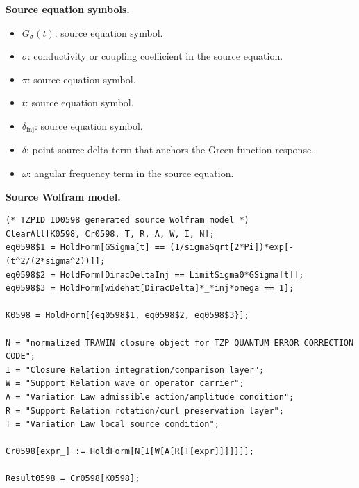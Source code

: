\begin{minipage}[t]{0.49\linewidth}
\begingroup
\small
\raggedright
\textbf{Source equation symbols.}\par
\begin{itemize}[leftmargin=1.35em,itemsep=1pt,topsep=1pt,parsep=0pt]
    \item $G_{\sigma}(t)$: source equation symbol.
    \item $\sigma$: conductivity or coupling coefficient in the source equation.
    \item $\pi$: source equation symbol.
    \item $t$: source equation symbol.
    \item $\delta_{\mathrm{inj}}$: source equation symbol.
    \item $\delta$: point-source delta term that anchors the Green-function response.
    \item $\omega$: angular frequency term in the source equation.
\end{itemize}
\endgroup
\end{minipage}\hfill
\begin{minipage}[t]{0.47\linewidth}
\begingroup
\scriptsize
\raggedright
\textbf{Source Wolfram model.}\par
\begin{Verbatim}[fontsize=\tiny,breaklines=true,breakanywhere=true]
(* TZPID ID0598 generated source Wolfram model *)
ClearAll[K0598, Cr0598, T, R, A, W, I, N];
eq0598$1 = HoldForm[GSigma[t] == (1/sigmaSqrt[2*Pi])*exp[-(t^2/(2*sigma^2))]];
eq0598$2 = HoldForm[DiracDeltaInj == LimitSigma0*GSigma[t]];
eq0598$3 = HoldForm[widehat[DiracDelta]*_*inj*omega == 1];

K0598 = HoldForm[{eq0598$1, eq0598$2, eq0598$3}];

N = "normalized TRAWIN closure object for TZP QUANTUM ERROR CORRECTION CODE";
I = "Closure Relation integration/comparison layer";
W = "Support Relation wave or operator carrier";
A = "Variation Law admissible action/amplitude condition";
R = "Support Relation rotation/curl preservation layer";
T = "Variation Law local source condition";

Cr0598[expr_] := HoldForm[N[I[W[A[R[T[expr]]]]]]];

Result0598 = Cr0598[K0598];
\end{Verbatim}
\endgroup
\end{minipage}

